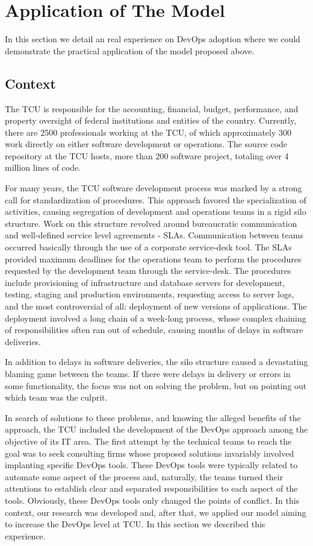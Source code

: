 \section{Application of The Model} \label{sec:tcu}

{
\color{blue}
In this section we detail an real experience on DevOps adoption where we could
demonstrate the practical application of the model proposed above.
}

\subsection{Context}

The TCU is responsible for the accounting, financial, budget, performance, and property
oversight of federal institutions and entities of the country. Currently, there are 2500
professionals working at the TCU, of which approximately 300 work directly on either
software development or operations. The source code repository at the TCU hosts,
more than 200 software project, totaling over 4 million lines of code.

{
\color{blue}
For many years, the TCU software development process was marked by a strong call
for standardization of procedures. This approach favored the specialization of
activities, causing segregation of development and operations teams in a rigid
silo structure. Work on this structure revolved around bureaucratic
communication and well-defined service level agreements - SLAs. Communication
between teams occurred basically through the use of a corporate service-desk tool.
The SLAs provided maximum deadlines for the operations team to perform the
procedures requested by the development team through the service-desk. The
procedures include provisioning of infrastructure and database servers for
development, testing, staging and production environments, requesting access
to server logs, and the most controversial of all: deployment of new versions
of applications. The deployment involved a long chain of a week-long process,
whose complex chaining of responsibilities often ran out of schedule, causing
months of delays in software deliveries.

In addition to delays in software deliveries, the silo structure caused a
devastating blaming game between the teams. If there were delays in delivery
or errors in some functionality, the focus was not on solving the problem, but
on pointing out which team was the culprit.

In search of solutions to these problems, and knowing the alleged benefits of
the approach, the TCU included the development of the DevOps approach among the
objective of its IT area. The first attempt by the technical teams to reach the
goal was to seek consulting firms whose proposed solutions invariably involved
implanting specific DevOps tools. These DevOps tools were typically related to
automate some aspect of the process and, naturally, the teams turned their
attentions to establish clear and separated responsibilities to each aspect of
the tools. Obviously, these DevOps tools only changed the points of conflict.
In this context, our research was developed and, after that, we applied our
model aiming to increase the DevOps level at TCU. In this section we described
this experience.
}

